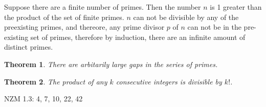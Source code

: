 \documentclass[11pt]{article} %
\newtheorem{theorem}{Theorem}[section]
\newenvironment{proof}[1][Proof]{\begin{trivlist}
\item[\hskip \labelsep {\bfseries #1}]}{\end{trivlist}}
\newenvironment{assignment}[1][Assignment]{\begin{trivlist}
\item[\hskip \labelsep {\bfseries #1}]}{\end{trivlist}}
\begin{document}
\begin{proof}
	Suppose there are a finite number of primes. Then the number $n$ is 1 greater than the product of the set of finite primes. $n$ can not be divisible by any of the preexisting primes, and thereore, any prime divisor $p$ of $n$ can not be in the pre-existing set of primes, therefore by induction, there are an infinite amount of distinct primes. 
\end{proof}

\begin{theorem}
	There are arbitarily large gaps in the series of primes. 
\end{theorem}

\begin{theorem}
	The product of any $k$ consecutive integers is divisible by $k!$. 
\end{theorem}

\begin{assignment}
	NZM 1.3: 4, 7, 10, 22, 42
\end{assignment}
\end{document}
